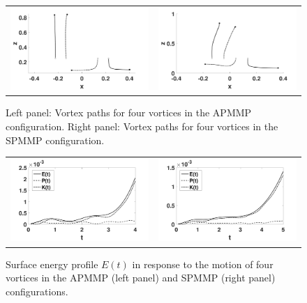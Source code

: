 \documentclass[a4paper,11pt]{article}
\begin{document}
\begin{figure}[!h]
\centering
\begin{tabular}{cc}
\includegraphics[width=.5\textwidth]{tracks_F_pt2_tf_4_pmmp} & 
\includegraphics[width=.5\textwidth]{tracks_F_pt2_tf_5_pmmp_sym}
\end{tabular}
\caption{\small Left panel: Vortex paths for four vortices in the APMMP configuration.
Right panel: Vortex paths for four vortices in the SPMMP configuration.}
\label{fig:trackpmmp}
\end{figure}

\begin{figure}[!h]
\centering
\begin{tabular}{cc}
\includegraphics[width=.5\textwidth]{energy_profile_mu_pt2_F_pt2_pmmp} &
\includegraphics[width=.5\textwidth]{energy_profile_mu_pt2_F_pt2_pmmp_sym}
\end{tabular}
\caption{\small Surface energy profile $E(t)$ in response to the motion of four vortices in the APMMP (left panel) and SPMMP (right panel) configurations.}
\label{fig:eprof_pmmp}
\end{figure}
\end{document}
